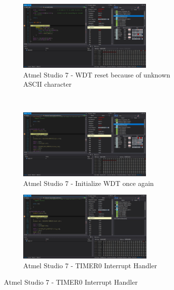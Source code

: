 \documentclass{article}
\begin{document}
\pagebreak
	\begin{figure}[h!]
		\centering
		\begin{subfigure}[t]{0.5\textwidth}
			\centering
			\includegraphics[height=3.5cm, width=\linewidth]{./results/lab6_sim_reset.jpg}
			\caption{Αtmel Studio 7 - WDT reset because of unknown ASCII character}
		\end{subfigure}%
		~
		\begin{subfigure}[t]{0.5\textwidth}
			\centering
			\includegraphics[height=3.5cm, width=\linewidth]{./results/lab6_sim_wdt_init_again.jpg}
			\caption{Αtmel Studio 7 - Initialize WDT once again}
		\end{subfigure}	
		\begin{subfigure}[t]{0.5\textwidth}
			\centering
			\includegraphics[height=3.5cm, width=\linewidth]{./results/lab6_sim_timer0.jpg}
			\caption{Αtmel Studio 7 - TIMER0 Interrupt Handler}
		\end{subfigure}	
	\end{figure}	
\end{document}
